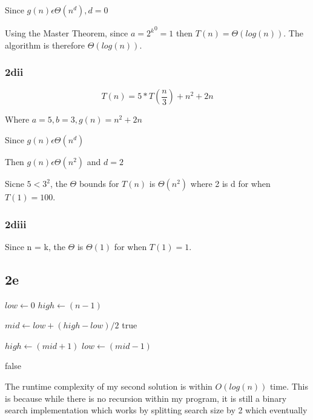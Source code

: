 \documentclass[oneside, a4paper]{article}
\begin{document}
Since $g(n) \epsilon \Theta(n^d), d = 0$

Using the Master Theorem, since $a = {2^k}^0 = 1$ then $T(n) = \Theta(log(n))$. The algorithm is therefore $\Theta(log(n))$. 

\subsubsection*{2dii}
\begin{center}
    $$T(n) = 5 * T (\frac{n}{3}) + n^2 + 2n$$

    Where $a = 5, b = 3, g(n) = n^2 + 2n$

    Since $g(n) \epsilon \Theta(n^d)$ 

    Then $g(n) \epsilon \Theta(n^2)$ and $d = 2$

    Sicne $5 < 3^2$, the $\Theta$ bounds for $T(n)$ is $\Theta(n^2)$ where 2 is d for when $T(1) = 100$.
\end{center}


\subsubsection*{2diii}
Since n = k, the $\Theta$ is  $\Theta(1)$ for when $T(1) = 1$.

\subsection*{2e}
\begin{algorithmic}
        \State $low \gets 0$
        \State $high \gets (n - 1)$


            \State $mid \gets low + (high - low) / 2$
                \State \Return true    
            \EndIf
                
                \State $high \gets (mid + 1)$
            \Else
                \State $low \gets (mid - 1)$
            \EndIf

        \EndWhile
        \State \Return false    
        
    \EndFunction
\end{algorithmic}

The runtime complexity of my second solution is within $O(log(n))$ time. This is because while there is no recursion within my program, it is still a binary search implementation which works by splitting search size by 2 which eventually 
\end{document}
